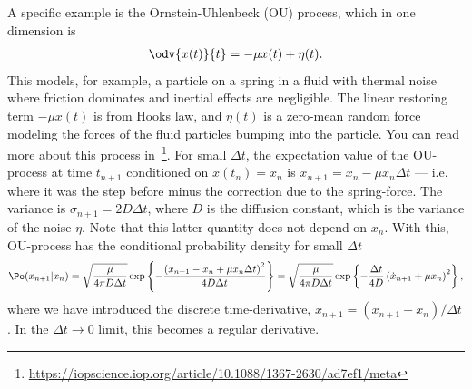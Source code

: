 A specific example is the Ornstein-Uhlenbeck (OU) process, which in one dimension is
%
\begin{align}
    \odv{ x(t) }{ t } = - \mu x(t) + \eta(t).
\end{align}
%
This models, for example, a particle on a spring in a fluid with thermal noise where friction dominates and inertial effects are negligible.
The linear restoring term $-\mu x(t)$ is from Hooks law, and $\eta(t)$ is a zero-mean random force modeling the forces of the fluid particles bumping into the particle.
You can read more about this process in~\footnote{\url{https://iopscience.iop.org/article/10.1088/1367-2630/ad7ef1/meta}}.
For small $\Delta t$, the expectation value of the OU-process at time $t_{n+1}$ conditioned on $x(t_n)=x_n$ is $\bar{x}_{n+1} = x_n - \mu x_n \Delta t$ --- i.e. where it was the step before minus the correction due to the spring-force.
The variance is $\sigma_{n+1} = 2D \Delta t$, where $D$ is the diffusion constant, which is the variance of the noise $\eta$. Note that this latter quantity does not depend on $x_n$.
With this, OU-process has the conditional probability density for small $\Delta t$
%
\begin{align}
    \Pe(x_{n + 1}| x_n) 
    = \sqrt{ \frac{ \mu }{ 4 \pi D \Delta t } }
    \exp \left\{ -
    \frac{ \left(x_{n + 1} - x_n + \mu x_n \Delta t\right)^2 }{ 4 D \Delta t } 
    \right\}
    = \sqrt{ \frac{ \mu }{ 4 \pi D \Delta t } }
    \exp \left\{ 
    - \frac{ \Delta t }{ 4 D }  \left(\dot x_{n + 1} + \mu x_n\right)^2
    \right\},
\end{align}
%
where we have introduced the discrete time-derivative, $\dot x_{n+1} = (x_{n + 1} - x_n) / \Delta t$.
In the $\Delta t \rightarrow 0$ limit, this becomes a regular derivative.



